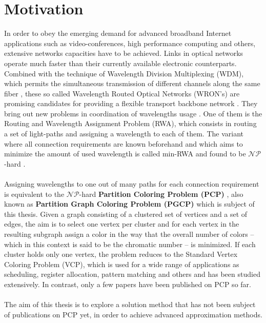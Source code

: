\section{Motivation}

In order to obey the emerging demand for advanced broadband Internet applications such as video-conferences, high performance computing and others, extensive networks capacities have to be achieved. Links in optical networks operate much faster than their currently available electronic counterparts. Combined with the technique of Wavelength Division Multiplexing (WDM), which permits the simultaneous transmission of different channels along the same fiber \cite{noronha-06}, these so called Wavelength Routed Optical Networks (WRON's) are promising candidates for providing a flexible transport backbone network \cite{krishnaswamy-01}. They bring out new problems in coordination of wavelengths usage \cite{murthy-02}. One of them is the Routing and Wavelength Assignment Problem (RWA), which consists in routing a set of light-paths and assigning a wavelength to each of them. The variant where all connection requirements are known beforehand and which aims to minimize the amount of used wavelength is called min-RWA and found to be $\mathcal{NP}$-hard \cite{erlebach-01}.\\\\
Assigning wavelengths to one out of many paths for each connection requirement is equivalent to the $\mathcal{NP}$-hard \textbf{Partition Coloring Problem (PCP)} \cite{li-00}, also known as \textbf{Partition Graph Coloring Problem (PGCP)} which is subject of this thesis. Given a graph consisting of a clustered set of vertices and a set of edges, the aim is to select one vertex per cluster and for each vertex in the resulting subgraph assign a color in the way that the overall number of colors -- which in this context is said to be the chromatic number -- is minimized. If each cluster holds only one vertex, the problem reduces to the Standard Vertex Coloring Problem (VCP), which is used for a wide range of applications as scheduling, register allocation, pattern matching and others and has been studied extensively. In contrast, only a few papers have been published on PCP so far.\\\\
The aim of this thesis is to explore a solution method that has not been subject of publications on PCP yet,	in order to achieve advanced approximation methods.


